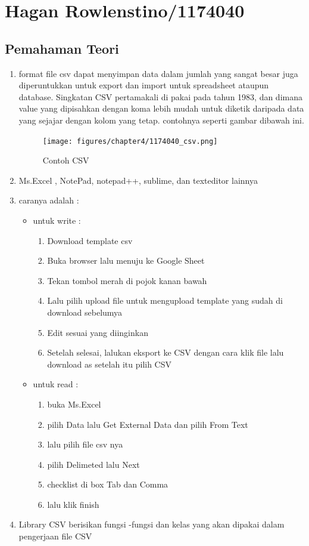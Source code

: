 \section{Hagan Rowlenstino/1174040}
	\subsection{Pemahaman Teori}
	\begin{enumerate}
	\item format file csv dapat menyimpan data dalam jumlah yang sangat besar juga diperuntukkan untuk export dan import untuk spreadsheet ataupun database. Singkatan CSV pertamakali di pakai pada tahun 1983, dan dimana value yang dipisahkan dengan koma lebih mudah untuk diketik daripada data yang sejajar dengan kolom yang tetap. contohnya seperti gambar dibawah ini.

	\begin{figure}[ht]
            \centerline{\texttt{[image: figures/chapter4/1174040\_csv.png]}}
            \caption{Contoh CSV}
            \label{1174040_csv}
            \end{figure}

	\item Ms.Excel , NotePad, notepad++, sublime, dan texteditor lainnya

	\item caranya adalah :
		\begin{itemize}
			\item untuk write :
			\begin{enumerate}
				\item Download template csv
				\item Buka browser lalu menuju ke Google Sheet
				\item Tekan tombol merah di pojok kanan bawah
				\item Lalu pilih upload file untuk mengupload template yang sudah di download sebelumya
				\item Edit sesuai yang diinginkan
				\item Setelah selesai, lalukan eksport ke CSV dengan cara klik file lalu download as setelah itu pilih CSV
			\end{enumerate}
			\item untuk read :
			\begin{enumerate}
				\item buka Ms.Excel
				\item pilih Data lalu Get External Data dan pilih From Text
				\item lalu pilih file csv nya
				\item pilih Delimeted lalu Next
				\item checklist di box Tab dan Comma
				\item lalu klik finish
			\end{enumerate}
		\end{itemize}	
	\item Library CSV berisikan fungsi -fungsi dan kelas yang akan dipakai dalam pengerjaan file CSV


\end{enumerate}
